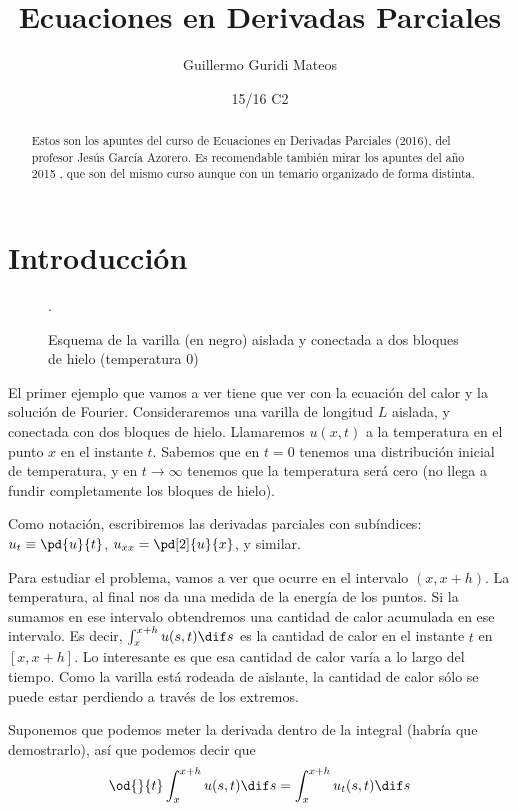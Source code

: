 \documentclass[palatino]{apuntes}
\title{Ecuaciones en Derivadas Parciales}
\author{Guillermo Guridi Mateos}
\date{15/16 C2}
\begin{document}
\pagestyle{plain}

\begin{abstract}
Estos son los apuntes del curso de Ecuaciones en Derivadas Parciales (2016), del profesor Jesús García Azorero. Es recomendable también mirar los apuntes del año 2015 \cite{ApuntesEDPRual}, que son del mismo curso aunque con un temario organizado de forma distinta.
\end{abstract}

\maketitle

\tableofcontents
\newpage

\chapter{Introducción}

\begin{figure}[hbtp]
\centering
{}
\caption{Esquema de la varilla (en negro) aislada y conectada a dos bloques de hielo (temperatura 0)}.
\label{fig:TransmisionCalor}
\end{figure}

El primer ejemplo que vamos a ver tiene que ver con la ecuación del calor y la solución de Fourier. Consideraremos una varilla de longitud $L$ aislada, y conectada con dos bloques de hielo. Llamaremos $u(x,t)$ a la temperatura en el punto $x$ en el instante $t$. Sabemos que en $t = 0$ tenemos una distribución inicial de temperatura, y en $t \to ∞$ tenemos que la temperatura será cero (no llega a fundir completamente los bloques de hielo).

Como notación, escribiremos las derivadas parciales con subíndices: $u_t \equiv \pd{u}{t}$, $u_{xx} = \pd[2]{u}{x}$, y similar.

Para estudiar el problema, vamos a ver que ocurre en el intervalo $(x, x+h)$. La temperatura, al final nos da una medida de la energía de los puntos. Si la sumamos en ese intervalo obtendremos una cantidad de calor acumulada en ese intervalo. Es decir, $\int_x^{x+h} u(s,t) \dif s$ es la cantidad de calor en el instante $t$ en $[x,x+h]$. Lo interesante es que esa cantidad de calor varía a lo largo del tiempo. Como la varilla está rodeada de aislante, la cantidad de calor sólo se puede estar perdiendo a través de los extremos.

Suponemos que podemos meter la derivada dentro de la integral (habría que demostrarlo), así que podemos decir que \[  \od{}{t} \int_x^{x+h} u(s,t) \dif s = \int_x^{x+h} u_t(s,t) \dif s\]
\end{document}
